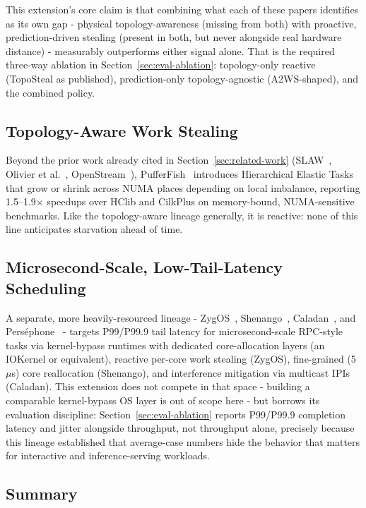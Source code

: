 This extension's core claim is that combining what each of these papers
identifies as its own gap - physical topology-awareness (missing from
both) with proactive, prediction-driven stealing (present in both, but
never alongside real hardware distance) - measurably outperforms either
signal alone. That is the required three-way ablation in
Section~\ref{sec:eval-ablation}: topology-only reactive (TopoSteal
as published), prediction-only topology-agnostic (A2WS-shaped), and the
combined policy.

\subsection{Topology-Aware Work Stealing}

Beyond the prior work already cited in Section~\ref{sec:related-work}
(SLAW~\cite{guo2010}, Olivier et al.~\cite{olivier2012}, OpenStream~\cite{drebes2014}),
PufferFish~\cite{pufferfish2020} introduces Hierarchical Elastic Tasks that
grow or shrink across NUMA places depending on local imbalance, reporting
1.5--1.9$\times$ speedups over HClib and CilkPlus on memory-bound,
NUMA-sensitive benchmarks. Like the topology-aware lineage generally, it
is reactive: none of this line anticipates starvation ahead of time.

\subsection{Microsecond-Scale, Low-Tail-Latency Scheduling}

A separate, more heavily-resourced lineage - ZygOS~\cite{zygos2017},
Shenango~\cite{shenango2019}, Caladan~\cite{caladan2020}, and
Perséphone~\cite{persephone} - targets P99/P99.9 tail latency for
microsecond-scale RPC-style tasks via kernel-bypass runtimes with
dedicated core-allocation layers (an IOKernel or equivalent), reactive
per-core work stealing (ZygOS), fine-grained (5\,$\mu$s) core reallocation
(Shenango), and interference mitigation via multicast IPIs (Caladan).
This extension does not compete in that space - building a comparable
kernel-bypass OS layer is out of scope here - but borrows its evaluation
discipline: Section~\ref{sec:eval-ablation} reports P99/P99.9 completion
latency and jitter alongside throughput, not throughput alone, precisely
because this lineage established that average-case numbers hide the
behavior that matters for interactive and inference-serving workloads.

\subsection{Summary}

